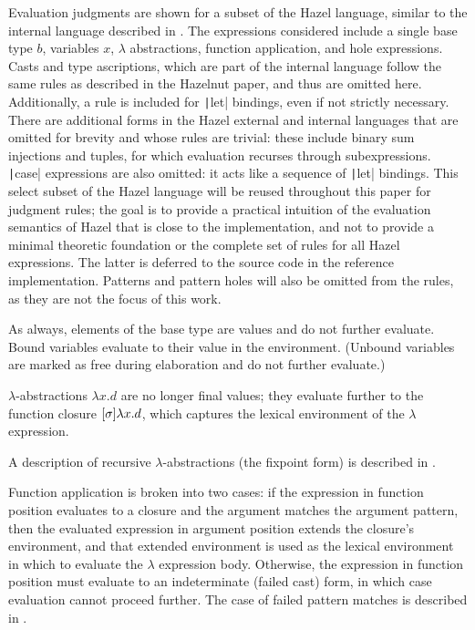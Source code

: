 Evaluation judgments are shown for a subset of the Hazel language, similar to the internal language described in \cite{conf/popl/HazelnutLive19}. The expressions considered include a single base type $b$, variables $x$, $\lambda$ abstractions, function application, and hole expressions. Casts and type ascriptions, which are part of the internal language follow the same rules as described in the Hazelnut paper, and thus are omitted here. Additionally, a rule is included for \texttt|let| bindings, even if not strictly necessary. There are additional forms in the Hazel external and internal languages that are omitted for brevity and whose rules are trivial: these include binary sum injections and tuples, for which evaluation recurses through subexpressions. \texttt|case| expressions are also omitted: it acts like a sequence of \texttt|let| bindings. This select subset of the Hazel language will be reused throughout this paper for judgment rules; the goal is to provide a practical intuition of the evaluation semantics of Hazel that is close to the implementation, and not to provide a minimal theoretic foundation or the complete set of rules for all Hazel expressions. The latter is deferred to the source code in the reference implementation. Patterns and pattern holes will also be omitted from the rules, as they are not the focus of this work.

As always, elements of the base type are values and do not further evaluate. Bound variables evaluate to their value in the environment. (Unbound variables are marked as free during elaboration and do not further evaluate.)

$\lambda$-abstractions $\lambda x.d$ are no longer final values; they evaluate further to the function closure $[\sigma]\lambda x.d$, which captures the lexical environment of the $\lambda$ expression.

A description of recursive $\lambda$-abstractions (the fixpoint form) is described in .

Function application is broken into two cases: if the expression in function position evaluates to a closure and the argument matches the argument pattern, then the evaluated expression in argument position extends the closure's environment, and that extended environment is used as the lexical environment in which to evaluate the $\lambda$ expression body. Otherwise, the expression in function position must evaluate to an indeterminate (failed cast) form, in which case evaluation cannot proceed further. The case of failed pattern matches is described in .


